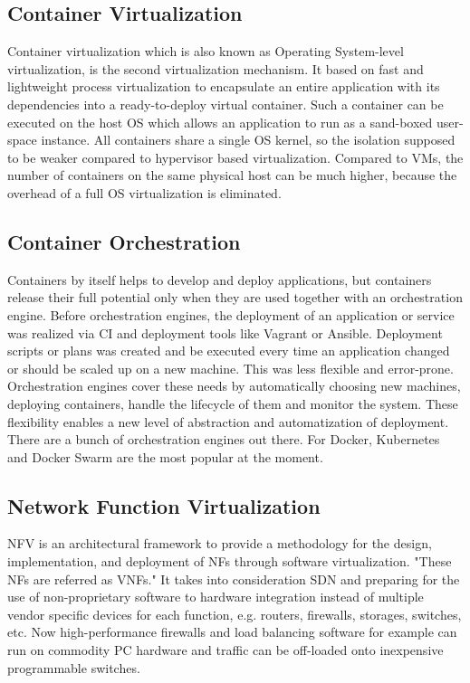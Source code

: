 \subsection{Container Virtualization}
Container virtualization which is also known as Operating System-level virtualization, is the second virtualization mechanism.
It based on fast and lightweight process virtualization to encapsulate an entire application with its dependencies into a ready-to-deploy virtual container.\autocite[cf.][p. 72]{Tosatto:2015}
Such a container can be executed on the host \ac{OS} which allows an application to run as a sand-boxed user-space instance.\autocite[cf.][p. 1]{Anderson:2016}
All containers share a single \ac{OS} kernel, so the isolation supposed to be weaker compared to hypervisor based virtualization.\autocite[cf.][p. 2]{Celesti:2016}
Compared to \acp{VM}, the number of containers on the same physical host can be much higher, because the overhead of a full \ac{OS} virtualization is eliminated.\autocite[cf.][p. 2]{Celesti:2016}


\subsection{Container Orchestration}
Containers by itself helps to develop and deploy applications, but containers release their full potential only when they are used together with an orchestration engine.
Before orchestration engines, the deployment of an application or service was realized via \ac{CI} and deployment tools like Vagrant or Ansible.
Deployment scripts or plans was created and be executed every time an application changed or should be scaled up on a new machine.
This was less flexible and error-prone.
Orchestration engines cover these needs by automatically choosing new machines, deploying containers, handle the lifecycle of them and monitor the system.
These flexibility enables a new level of abstraction and automatization of deployment.
There are a bunch of orchestration engines out there.
For Docker, Kubernetes and Docker Swarm are the most popular at the moment.


\subsection{Network Function Virtualization}
\ac{NFV} is an architectural framework to provide a methodology for the design, implementation, and deployment of \acp{NF} through software virtualization.\autocite[cf.][p. 8]{ETSI:NFV:2013}\autocite[cf.]{Rivenes:2014}
"These \acp{NF} are referred as \acp{VNF}."\autocite[p. 8]{ETSI:NFV:2013}
It takes into consideration \ac{SDN} and preparing for the use of non-proprietary software to hardware integration instead of multiple vendor specific devices for each function, e.g. routers, firewalls, storages, switches, etc.\autocite[cf.]{Rivenes:2014}
Now high-performance firewalls and load balancing software for example can run on commodity PC hardware and traffic can be off-loaded onto inexpensive programmable switches.\autocite[cf.]{Noble:2015}

